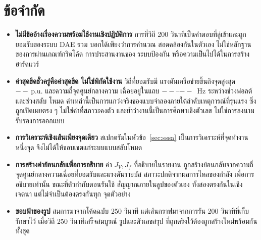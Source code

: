 \documentclass[12pt,a4paper]{article}
\newcommand{\pu}{\,\mathrm{p.u.}}
\newcommand{\NewRunVMax}{--}\newcommand{\NewRunFMin}{--}%
\newcommand{\NewRunFMax}{--}\newcommand{\NewRunSubdivision}{--}%
\begin{document}
\section{ข้อจำกัด}\label{sec:lim}
\begin{itemize}\itemsep2pt
  \item \textbf{ไม่มีข้ออ้างเรื่องความพร้อมใช้งานเชิงปฏิบัติการ} การที่วิถี 200
        วินาทีเป็นคำตอบที่ลู่เข้าและถูกยอมรับของระบบ DAE รวม บอกได้เพียงว่าการคำนวณ
        สอดคล้องกันในตัวเอง ไม่ใช่หลักฐานของการผ่านเกณฑ์กริดโค้ด การประสานงานของ
        ระบบป้องกัน หรือความเป็นไปได้ในการสร้างฮาร์ดแวร์
  \item \textbf{ค่าสุดขีดชั่วครู่คือค่าสุดขีด ไม่ใช่พิกัดใช้งาน} วิถีที่ยอมรับมี
        แรงดันเครือข่ายขึ้นถึงจุดสูงสุด $\NewRunVMax\pu$ และความถี่จุดศูนย์กลางความ
        เฉื่อยอยู่ในแถบ $\NewRunFMin$--$\NewRunFMax$~Hz ระหว่างช่วงฟอลต์และช่วงสลับ
        โหมด ค่าเหล่านี้เป็นการแกว่งจริงของแบบจำลองภายใต้ลำดับเหตุการณ์ที่รุนแรง ซึ่ง
        ถูกเปิดเผยตรง ๆ ไม่ใช่ค่าที่สภาวะคงตัว และย้ำว่างานนี้เป็นการศึกษาเชิงตัวเลข
        ไม่ใช่การลงนามรับรองการออกแบบ
  \item \textbf{การวิเคราะห์เชิงเส้นเพียงจุดเดียว} สเปกตรัมในหัวข้อ~\ref{sec:sssa}
        เป็นการวิเคราะห์ที่จุดทำงานหนึ่งจุด จึงไม่ได้ให้ขอบเขตแก่ระบบแบบสลับโหมด
  \item \textbf{การสร้างค่าย้อนกลับเพื่อการอธิบาย} ค่า $J_V,J_f$ ที่อธิบายในรายงาน
        ถูกสร้างย้อนกลับจากความถี่จุดศูนย์กลางความเฉื่อยที่ยอมรับและแรงดันรายบัส
        สภาวะปกติจากผลการไหลของกำลัง เพื่อการอธิบายเท่านั้น ขณะที่ตัวกำกับตอนรันใช้
        สัญญาณภายในลูปของตัวเอง ทั้งสองตรงกันในเชิงเจตนา แต่ไม่จำเป็นต้องตรงกันทุก
        จุดตัวอย่าง
  \item \textbf{ขอบฟ้าของรูป} สมการมาจากโค้ดฉบับ 250 วินาที แต่เส้นกราฟมาจากการรัน
        200 วินาทีที่เก็บรักษาไว้ เมื่อวิถี 250 วินาทีเสร็จสมบูรณ์ รูปและตัวเลขสรุป
        ที่ถูกตรึงไว้ต้องถูกสร้างใหม่พร้อมกันทั้งชุด
\end{itemize}
\end{document}

